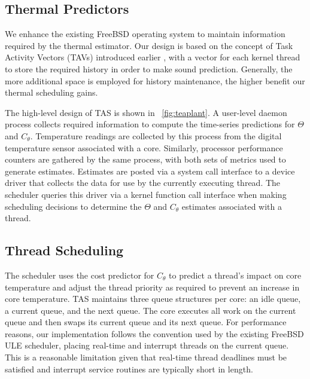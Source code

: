 \documentclass[times, 10pt,twocolumn]{IEEEtran}
\begin{document}
\subsection{Thermal Predictors}
\label{sec:therm-pred-design} 
We enhance the existing FreeBSD operating system to maintain information
required by the thermal estimator. Our design is based on the concept of
Task Activity Vectors (TAVs) introduced earlier \cite{Merkel2008a},
with a vector for each kernel thread to store the required history in order to make
sound prediction.  Generally, the more additional space is employed
for history maintenance, the higher benefit our thermal scheduling gains.

The high-level design of TAS is shown in \figurename~\ref{fig:teaplant}.
A user-level daemon process collects required information to compute
the time-series predictions for $\Theta$ and $C_{\theta}$. Temperature
readings are collected by this process from the digital temperature
sensor associated with a core.  Similarly, processor performance
counters are gathered by the same process, with both sets of metrics
used to generate estimates. Estimates are posted via a system call
interface to a device driver that collects the data for use by
the currently executing thread.  The scheduler queries this
driver via a kernel function call interface when making scheduling
decisions to determine the $\Theta$ and $C_{\theta}$ estimates
associated with a thread.

\subsection{Thread Scheduling}
\label{sec:selection} 
The scheduler uses the cost predictor for $C_{\theta}$ to predict a
thread's impact on core temperature and adjust the
thread priority as required to prevent an increase in core temperature.
TAS maintains three queue structures per core: an idle queue, a
current queue, and the next queue. The core executes all work on the
current queue and then swaps its current queue and its next queue. For
performance reasons, our implementation follows the convention used by
the existing FreeBSD ULE scheduler, placing real-time and interrupt
threads on the current queue.  This is a reasonable limitation given that
real-time thread deadlines must be satisfied and 
interrupt service routines are typically short in length.
\end{document}

